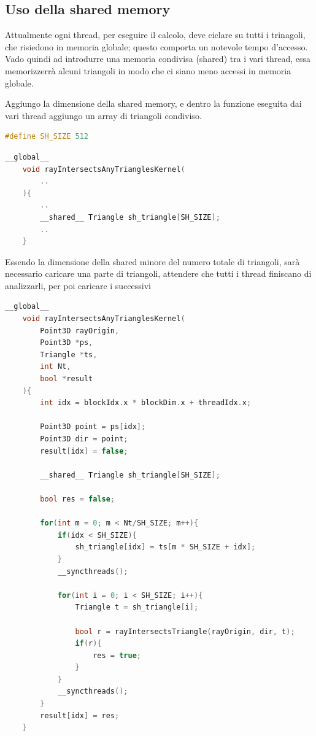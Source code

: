 \documentclass[a4paper]{article}
\begin{document}
\newpage

\subsection{Uso della shared memory}
Attualmente ogni thread, per eseguire il calcolo, deve ciclare su tutti i trinagoli, che risiedono in memoria globale; questo comporta un notevole tempo d'accesso.
Vado quindi ad introdurre una memoria condivisa (shared) tra i vari thread, essa memorizzerrà alcuni triangoli in modo che ci siano meno accessi in memoria globale.

Aggiungo la dimensione della shared memory, e dentro la funzione eseguita dai vari thread aggiungo un array di triangoli condiviso.

\begin{lstlisting}[language=c++]
    #define SH_SIZE 512
\end{lstlisting}

\begin{lstlisting}[language=c++]
    __global__
    void rayIntersectsAnyTrianglesKernel(
        ..
    ){
        ..
        __shared__ Triangle sh_triangle[SH_SIZE];
        ..
    }
\end{lstlisting}

Essendo la dimensione della shared minore del numero totale di triangoli, sarà necessario caricare una parte di triangoli, attendere che tutti i thread finiscano di analizzarli, per poi caricare i successivi

\begin{lstlisting}[language=c++]
    __global__
    void rayIntersectsAnyTrianglesKernel(
        Point3D rayOrigin, 
        Point3D *ps,
        Triangle *ts,
        int Nt,
        bool *result
    ){
        int idx = blockIdx.x * blockDim.x + threadIdx.x;
    
        Point3D point = ps[idx];   
        Point3D dir = point;
        result[idx] = false;
        
        __shared__ Triangle sh_triangle[SH_SIZE];
        
        bool res = false;
        
        for(int m = 0; m < Nt/SH_SIZE; m++){
            if(idx < SH_SIZE){
                sh_triangle[idx] = ts[m * SH_SIZE + idx];
            }
            __syncthreads();
    
            for(int i = 0; i < SH_SIZE; i++){
                Triangle t = sh_triangle[i];
                
                bool r = rayIntersectsTriangle(rayOrigin, dir, t);
                if(r){
                    res = true;
                }
            }
            __syncthreads();
        }
        result[idx] = res;
    }
\end{lstlisting}
\end{document}

